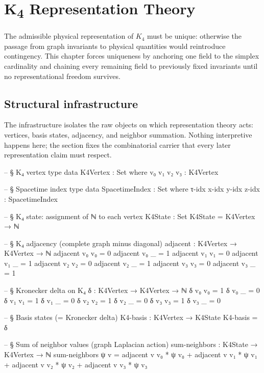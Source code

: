 \documentclass[11pt,a4paper]{book}
\begin{document}
\chapter{K\textsubscript{4} Representation Theory}

The admissible physical representation of $K_4$ must be unique: otherwise the passage from graph invariants to physical quantities would reintroduce contingency. This chapter forces uniqueness by anchoring one field to the simplex cardinality and chaining every remaining field to previously fixed invariants until no representational freedom survives.

\section{Structural infrastructure}

The infrastructure isolates the raw objects on which representation theory acts: vertices, basis states, adjacency, and neighbor summation. Nothing interpretive happens here; the section fixes the combinatorial carrier that every later representation claim must respect.

\begin{code}
-- § K₄ vertex type
data K4Vertex : Set where
  v₀ v₁ v₂ v₃ : K4Vertex

-- § Spacetime index type
data SpacetimeIndex : Set where
  τ-idx x-idx y-idx z-idx : SpacetimeIndex

-- § K₄ state: assignment of ℕ to each vertex
K4State : Set
K4State = K4Vertex → ℕ

-- § K₄ adjacency (complete graph minus diagonal)
adjacent : K4Vertex → K4Vertex → ℕ
adjacent v₀ v₀ = 0
adjacent v₀ _  = 1
adjacent v₁ v₁ = 0
adjacent v₁ _  = 1
adjacent v₂ v₂ = 0
adjacent v₂ _  = 1
adjacent v₃ v₃ = 0
adjacent v₃ _  = 1

-- § Kronecker delta on K₄
δ : K4Vertex → K4Vertex → ℕ
δ v₀ v₀ = 1
δ v₀ _  = 0
δ v₁ v₁ = 1
δ v₁ _  = 0
δ v₂ v₂ = 1
δ v₂ _  = 0
δ v₃ v₃ = 1
δ v₃ _  = 0

-- § Basis states (= Kronecker delta)
K4-basis : K4Vertex → K4State
K4-basis = δ

-- § Sum of neighbor values (graph Laplacian action)
sum-neighbors : K4State → K4Vertex → ℕ
sum-neighbors ψ v = adjacent v v₀ * ψ v₀ + adjacent v v₁ * ψ v₁
                  + adjacent v v₂ * ψ v₂ + adjacent v v₃ * ψ v₃
\end{code}
\end{document}
